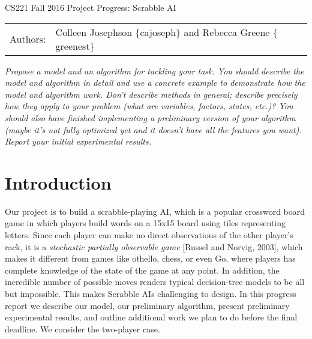 \documentclass[12pt]{article}
\begin{document}
\begin{center}
{\Large CS221 Fall 2016 Project Progress: Scrabble AI}

\begin{tabular}{rl}
  Authors: & Colleen Josephson $\{$cajoseph$\}$ and Rebecca Greene $\{$greenest$\}$\\
\end{tabular}
\end{center}

\emph{Propose a model and an algorithm for tackling your task. You should
describe the model and algorithm in detail and use a concrete example
to demonstrate how the model and algorithm work. Don't describe
methods in general; describe precisely how they apply to your problem
(what are variables, factors, states, etc.)? You should also have
finished implementing a preliminary version of your algorithm (maybe
it's not fully optimized yet and it doesn't have all the features you
want). Report your initial experimental results.}


\section{Introduction}
Our project is to build a scrabble-playing AI, which is a popular
crossword board game in which players build words on a 15x15 board
using tiles representing letters. Since each player can make no direct
observations of the other player's rack, it is a \emph{stochastic
  partially observable game} [Russel and Norvig, 2003], which makes it
different from games like othello, chess, or even Go, where players
has complete knowledge of the state of the game at any point. In
addition, the incredible number of possible moves renders typical
decision-tree models to be all but impossible. This makes Scrabble AIs
challenging to design. In this progress report we describe our model,
our preliminary algorithm, present preliminary experimental results,
and outline additional work we plan to do before the final
deadline. We consider the two-player case.
\end{document}
